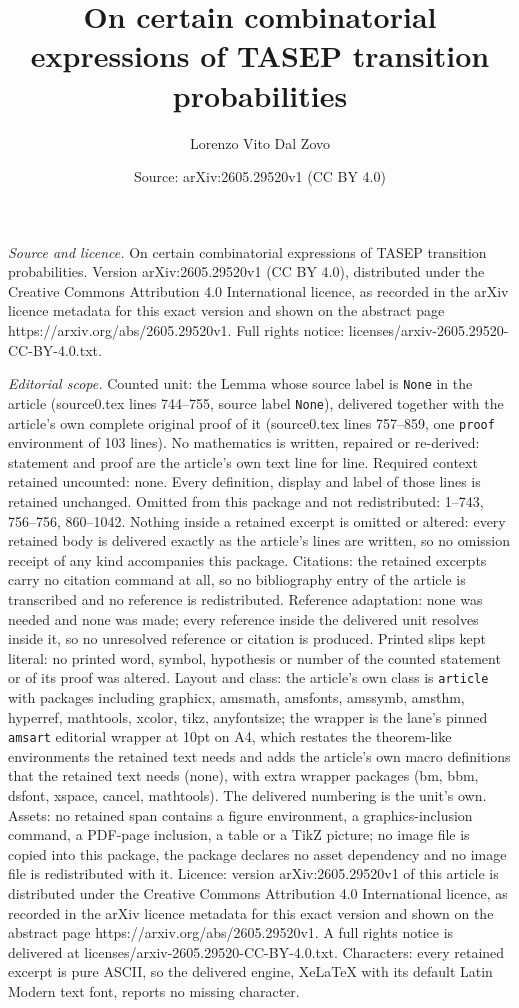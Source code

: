 \documentclass[10pt,a4paper]{amsart}
\title[On certain combinatorial expressions of TASEP transition pro]{On certain combinatorial expressions of TASEP transition probabilities}
\author{Lorenzo Vito Dal Zovo}
\date{Source: arXiv:2605.29520v1 (CC BY 4.0)}
\begin{document}
\maketitle

\noindent\emph{Source and licence.} On certain combinatorial expressions of TASEP transition probabilities. Version arXiv:2605.29520v1 (CC BY 4.0), distributed under the Creative Commons Attribution 4.0 International licence, as recorded in the arXiv licence metadata for this exact version and shown on the abstract page https://arxiv.org/abs/2605.29520v1. Full rights notice: licenses/arxiv-2605.29520-CC-BY-4.0.txt.\par\smallskip

\noindent\textit{Editorial scope.} Counted unit: the Lemma whose source label is \texttt{None} in the article (source0.tex lines 744--755, source label \texttt{None}), delivered together with the article's own complete original proof of it (source0.tex lines 757--859, one \texttt{proof} environment of 103 lines). No mathematics is written, repaired or re-derived: statement and proof are the article's own text line for line. Required context retained uncounted: none. Every definition, display and label of those lines is retained unchanged. Omitted from this package and not redistributed: 1--743, 756--756, 860--1042. Nothing inside a retained excerpt is omitted or altered: every retained body is delivered exactly as the article's lines are written, so no omission receipt of any kind accompanies this package. Citations: the retained excerpts carry no citation command at all, so no bibliography entry of the article is transcribed and no reference is redistributed. Reference adaptation: none was needed and none was made; every reference inside the delivered unit resolves inside it, so no unresolved reference or citation is produced. Printed slips kept literal: no printed word, symbol, hypothesis or number of the counted statement or of its proof was altered. Layout and class: the article's own class is \texttt{article} with packages including graphicx, amsmath, amsfonts, amssymb, amsthm, hyperref, mathtools, xcolor, tikz, anyfontsize; the wrapper is the lane's pinned \texttt{amsart} editorial wrapper at 10pt on A4, which restates the theorem-like environments the retained text needs and adds the article's own macro definitions that the retained text needs (none), with extra wrapper packages (bm, bbm, dsfont, xspace, cancel, mathtools). The delivered numbering is the unit's own. Assets: no retained span contains a figure environment, a graphics-inclusion command, a PDF-page inclusion, a table or a TikZ picture; no image file is copied into this package, the package declares no asset dependency and no image file is redistributed with it. Licence: version arXiv:2605.29520v1 of this article is distributed under the Creative Commons Attribution 4.0 International licence, as recorded in the arXiv licence metadata for this exact version and shown on the abstract page https://arxiv.org/abs/2605.29520v1. A full rights notice is delivered at licenses/arxiv-2605.29520-CC-BY-4.0.txt. Characters: every retained excerpt is pure ASCII, so the delivered engine, XeLaTeX with its default Latin Modern text font, reports no missing character.
\end{document}
